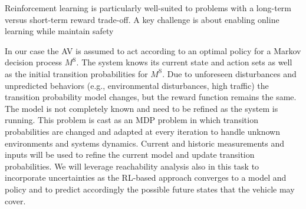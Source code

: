 Reinforcement learning is particularly well-suited to problems with a long-term versus short-term reward trade-off. A key challenge is about enabling online learning while maintain safety ~\cite{kearns2002near, abbeel2005exploration, abbeel2006using}

In our case the AV is assumed to act according to an optimal policy for a Markov decision process $M^{\mbox{S}}$. The system knows its current state and action sets as well as the initial transition probabilities for $M^{\mbox{S}}$. Due to unforeseen disturbances and unpredicted behaviors (e.g., environmental disturbances, high traffic) the transition probability model changes, but the reward function remains the same. The model is not completely known and need to be refined as the system is running. This problem is cast as an MDP problem in which transition probabilities are changed and adapted at every iteration to handle unknown environments and systems dynamics. 
Current and historic measurements and inputs will be used to refine the current model and update transition probabilities. 
We will leverage reachability analysis also in this task to incorporate uncertainties as the RL-based approach converges to a model and policy and to predict accordingly the possible future states that the vehicle may cover. 


